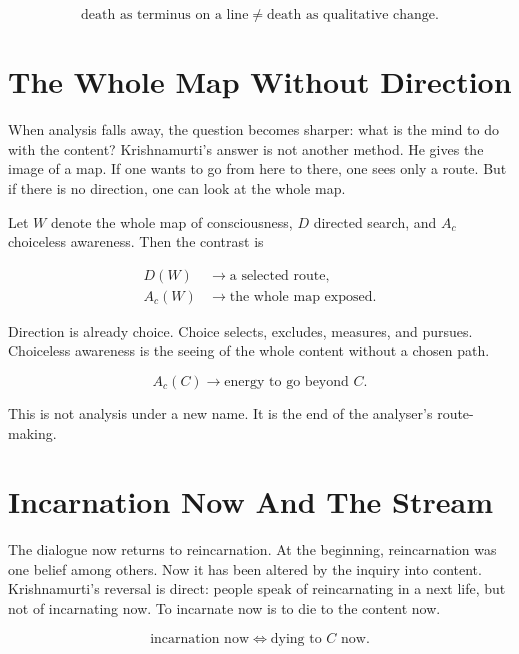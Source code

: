 \documentclass[11pt,oneside]{book}
\begin{document}
\begin{equation}
\text{death as terminus on a line}
\neq
\text{death as qualitative change}.
\end{equation}

\section{The Whole Map Without Direction}

When analysis falls away, the question becomes sharper: what is the mind to do with the content? Krishnamurti's answer is not another method. He gives the image of a map. If one wants to go from here to there, one sees only a route. But if there is no direction, one can look at the whole map.

Let \(W\) denote the whole map of consciousness, \(D\) directed search, and \(A_c\) choiceless awareness. Then the contrast is

\begin{align}
D(W) &\longrightarrow \text{a selected route},\\
A_c(W) &\longrightarrow \text{the whole map exposed}.
\end{align}

Direction is already choice. Choice selects, excludes, measures, and pursues. Choiceless awareness is the seeing of the whole content without a chosen path.

\begin{equation}
A_c(C)
\longrightarrow
\text{energy to go beyond } C.
\end{equation}

This is not analysis under a new name. It is the end of the analyser's route-making.

\section{Incarnation Now And The Stream}

The dialogue now returns to reincarnation. At the beginning, reincarnation was one belief among others. Now it has been altered by the inquiry into content. Krishnamurti's reversal is direct: people speak of reincarnating in a next life, but not of incarnating now. To incarnate now is to die to the content now.

\begin{equation}
\text{incarnation now}
\Longleftrightarrow
\text{dying to } C \text{ now}.
\end{equation}
\end{document}
